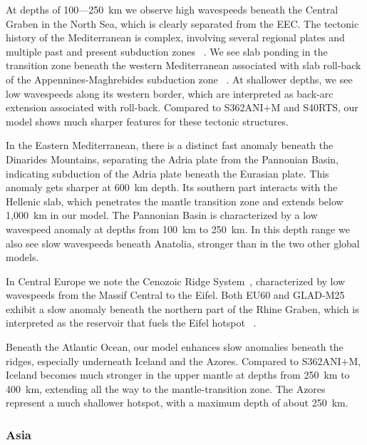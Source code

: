 \documentclass[extra,mreferee]{gji}
\begin{document}
At depths of 100---250~km we observe high wavespeeds beneath the Central Graben
in the North Sea, which is clearly separated from the EEC.
The tectonic history of the Mediterranean is complex,
involving several regional plates and multiple past and present subduction zones
~\citep{dewey1989kinematics}.
We see slab ponding in the transition zone beneath the western Mediterranean
associated with slab roll-back of the Appennines-Maghrebides subduction zone
~\citep{wortel2000subduction, zhu2012structure}.
At shallower depths, we see low wavespeeds along its western border,
which are interpreted as back-arc extension associated with  roll-back.
Compared to S362ANI$+$M and S40RTS,
our model shows much sharper features for these tectonic structures.

In the Eastern Mediterranean, there is a distinct fast anomaly beneath the 
Dinarides Mountains, separating the Adria plate from the Pannonian Basin,
indicating subduction of the Adria plate beneath the Eurasian plate.
This anomaly gets sharper at 600~km depth.
Its southern part interacts with the Hellenic slab, which penetrates the mantle
transition zone and extends below 1,000~km in our model.
The Pannonian Basin is characterized by a low wavespeed
anomaly at depths from 100~km to 250~km.
In this depth range we also see slow wavespeeds beneath Anatolia,
stronger than in the two other global models.

In Central Europe we note the Cenozoic Ridge System~\citep{ziegler1992european},
characterized by low 
wavespeeds from the Massif Central to the Eifel. Both EU60 and
GLAD-M25 exhibit a slow anomaly beneath the northern part of the Rhine Graben,
which is interpreted as the reservoir that fuels the Eifel hotspot
~\citep{goes1999lower, zhu2015seismic}.

Beneath the Atlantic Ocean, our model enhances slow anomalies beneath the
ridges, especially underneath Iceland and the Azores.
Compared to S362ANI$+$M, Iceland becomes much stronger in the upper mantle at
depths from 250~km to 400~km, extending all the way to the mantle-transition zone.
The Azores represent a much shallower hotspot, with a maximum depth of about 250~km.

\subsubsection{Asia}
\end{document}
